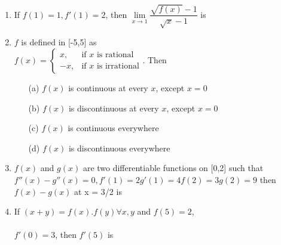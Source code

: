 \begin{enumerate}[label=\arabic*.,ref=\thesubsection.\theenumi]
\item If $f(1)=1, f'(1)=2$, then $\lim\limits_{x \to 1}\dfrac{\sqrt{f(x)}-1}{\sqrt{x}-1}$ is
\begin{itemize}
\end{itemize}

\item$f$ is defined in [-5,5] as\\
$f(x)=\begin{cases}
x, & \text{if $x$ is rational}\\
-x, & \text{if $x$ is irrational}
\end{cases}$. Then
\begin{itemize}
\item[(a)] $f(x)$ is continuous at every $x$, except $x=0$
\item[(b)] $f(x)$ is discontinuous at every $x$, except $x=0$
\item[(c)] $f(x)$ is continuous everywhere
\item[(d)] $f(x)$ is discontinuous everywhere\\
\end{itemize}

\item$f(x)$ and $g(x)$ are two differentiable functions on [0,2] such that $f''(x)-g''(x)=0, f'(1)=2g'(1)=4f(2)=3g(2)=9$ then $f(x)-g(x)$ at x = 3/2 is
\begin{itemize}
\end{itemize}

\item If $(x+y)=f(x).f(y) \forall x, y$ and $f(5)=2$, \\ \\$f'(0)=3$, then $f'(5)$ is
\begin{itemize}
\end{itemize}


\end{enumerate}

